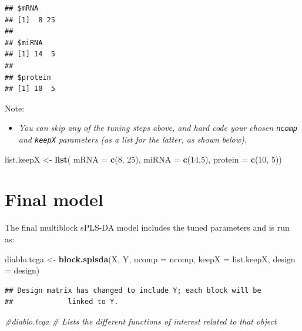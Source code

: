 \documentclass[]{book}
\newenvironment{Shaded}{\begin{snugshade}}{\end{snugshade}}
\newcommand{\CommentTok}[1]{\textcolor[rgb]{0.56,0.35,0.01}{\textit{#1}}}
\newcommand{\DataTypeTok}[1]{\textcolor[rgb]{0.13,0.29,0.53}{#1}}
\newcommand{\DecValTok}[1]{\textcolor[rgb]{0.00,0.00,0.81}{#1}}
\newcommand{\KeywordTok}[1]{\textcolor[rgb]{0.13,0.29,0.53}{\textbf{#1}}}
\newcommand{\NormalTok}[1]{#1}
\newcommand{\StringTok}[1]{\textcolor[rgb]{0.31,0.60,0.02}{#1}}
\providecommand{\tightlist}{%
  \setlength{\itemsep}{0pt}\setlength{\parskip}{0pt}}
\begin{document}
\begin{verbatim}
## $mRNA
## [1]  8 25
## 
## $miRNA
## [1] 14  5
## 
## $protein
## [1] 10  5
\end{verbatim}

Note:

\begin{itemize}
\tightlist
\item
  \emph{You can skip any of the tuning steps above, and hard code your chosen \texttt{ncomp} and \texttt{keepX} parameters (as a list for the latter, as shown below).}
\end{itemize}

\begin{Shaded}
\begin{Highlighting}[]
\NormalTok{list.keepX <-}\StringTok{ }\KeywordTok{list}\NormalTok{( }\DataTypeTok{mRNA =} \KeywordTok{c}\NormalTok{(}\DecValTok{8}\NormalTok{, }\DecValTok{25}\NormalTok{), }\DataTypeTok{miRNA =} \KeywordTok{c}\NormalTok{(}\DecValTok{14}\NormalTok{,}\DecValTok{5}\NormalTok{), }\DataTypeTok{protein =} \KeywordTok{c}\NormalTok{(}\DecValTok{10}\NormalTok{, }\DecValTok{5}\NormalTok{))}
\end{Highlighting}
\end{Shaded}

\hypertarget{final-model}{%
\section{Final model}\label{final-model}}

The final multiblock sPLS-DA model includes the tuned parameters and is run as:

\begin{Shaded}
\begin{Highlighting}[]
\NormalTok{diablo.tcga <-}\StringTok{ }\KeywordTok{block.splsda}\NormalTok{(X, Y, }\DataTypeTok{ncomp =}\NormalTok{ ncomp, }
                            \DataTypeTok{keepX =}\NormalTok{ list.keepX, }\DataTypeTok{design =}\NormalTok{ design)}
\end{Highlighting}
\end{Shaded}

\begin{verbatim}
## Design matrix has changed to include Y; each block will be
##             linked to Y.
\end{verbatim}

\begin{Shaded}
\begin{Highlighting}[]
\CommentTok{#diablo.tcga   # Lists the different functions of interest related to that object}
\end{Highlighting}
\end{Shaded}
\end{document}
